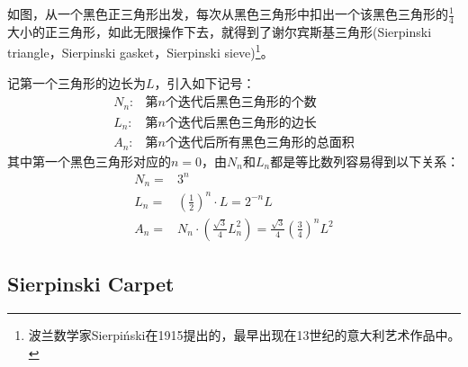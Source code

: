 如图，从一个黑色正三角形出发，每次从黑色三角形中扣出一个该黑色三角形的$\frac14$大小的正三角形，如此无限操作下去，就得到了谢尔宾斯基三角形(Sierpinski triangle，Sierpinski gasket，Sierpinski sieve)\footnote{波兰数学家Sierpiński在1915提出的，最早出现在13世纪的意大利艺术作品中。}。

记第一个三角形的边长为$L$，引入如下记号：
\begin{align*}
  N_n:{}&\text{第$n$个迭代后黑色三角形的个数}\\
  L_n:{}&\text{第$n$个迭代后黑色三角形的边长}\\
  A_n:{}&\text{第$n$个迭代后所有黑色三角形的总面积}
\end{align*}
其中第一个黑色三角形对应的$n=0$，由$N_n$和$L_n$都是等比数列容易得到以下关系：
\begin{align*}
  N_n={}& 3^n\\
  L_n={}& \left(\frac12\right)^n\cdot L=2^{-n}L\\
  A_n={}& N_n \cdot \left(\frac{\sqrt3}{4} L_n^2\right)=\frac{\sqrt3}{4} \left(\frac34\right)^n L^2
\end{align*}



\subsection{Sierpinski Carpet}
\label{sec:sierpinski-carpet}

